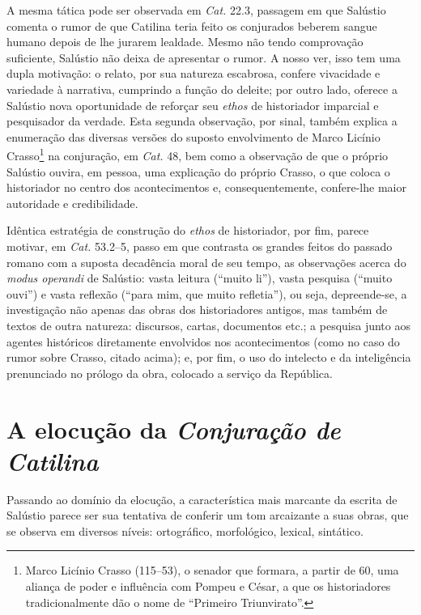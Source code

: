  
 A
 mesma tática pode ser observada em \emph{Cat.} 22.3, passagem em que Salústio comenta o
 rumor de que Catilina teria feito os conjurados beberem sangue humano depois de
 lhe jurarem lealdade. Mesmo não tendo
   comprovação suficiente, Salústio não deixa de apresentar o rumor. A nosso
   ver, isso tem uma dupla motivação: o relato, por sua natureza escabrosa,
   confere vivacidade e variedade à narrativa, cumprindo a função do deleite;
   por outro lado, oferece a Salústio nova oportunidade de reforçar seu
   \emph{ethos} de historiador imparcial e pesquisador da verdade. Esta segunda
   observação, por sinal, também explica a enumeração das diversas versões do
   suposto envolvimento de Marco Licínio Crasso\footnote{Marco Licínio Crasso
   (115--53), o senador que formara, a partir de 60, uma aliança de
 poder e influência com Pompeu e César, a que os historiadores tradicionalmente
 dão o nome de “Primeiro  Triunvirato”.} na conjuração, em \emph{Cat.} 48, bem
 como a observação de que o próprio Salústio ouvira, em pessoa, uma explicação
  do próprio Crasso, o que coloca o historiador no centro dos acontecimentos e,
 consequentemente, confere-lhe maior autoridade e credibilidade.
 

   
   
   Idêntica
   estratégia de construção do \emph{ethos} de historiador, por fim, parece
   motivar, em \emph{Cat.} 53.2--5, passo em que contrasta os grandes feitos do passado romano com a suposta decadência moral de seu tempo, as observações acerca do \emph{modus operandi} de Salústio: vasta leitura (``muito li''), vasta pesquisa (``muito ouvi'') e vasta reflexão (``para mim, que muito refletia''), ou seja, depreende-se, a investigação não apenas das obras dos historiadores antigos, mas também de textos de outra natureza: discursos, cartas, documentos etc.; a pesquisa junto aos agentes históricos diretamente envolvidos nos acontecimentos (como no caso do rumor sobre Crasso, citado acima); e, por fim, o uso do intelecto e da inteligência prenunciado no prólogo da obra, colocado a serviço da República. 
   
   
 



\section{A elocução da \emph{Conjuração de Catilina}}

 Passando ao domínio da elocução, a característica mais marcante da escrita de
 Salústio parece ser sua tentativa de conferir um tom arcaizante a suas
 obras, que se observa em diversos níveis: ortográfico, morfológico, lexical,
 sintático. 
 
